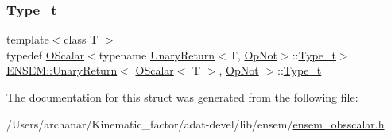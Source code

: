 \mbox{\label{structENSEM_1_1UnaryReturn_3_01OScalar_3_01T_01_4_00_01OpNot_01_4_a0a3874d32de1d033bfe55bfd921d73be}} 
\subsubsection{\texorpdfstring{Type\_t}{Type\_t}\hspace{0.1cm}{\footnotesize\ttfamily [3/3]}}
{\footnotesize\ttfamily template$<$class T $>$ \\
typedef \mbox{\hyperlink{classENSEM_1_1OScalar}{O\+Scalar}}$<$typename \mbox{\hyperlink{structENSEM_1_1UnaryReturn}{Unary\+Return}}$<$T, \mbox{\hyperlink{structENSEM_1_1OpNot}{Op\+Not}}$>$\+::\mbox{\hyperlink{structENSEM_1_1UnaryReturn_3_01OScalar_3_01T_01_4_00_01OpNot_01_4_a0a3874d32de1d033bfe55bfd921d73be}{Type\+\_\+t}}$>$ \mbox{\hyperlink{structENSEM_1_1UnaryReturn}{E\+N\+S\+E\+M\+::\+Unary\+Return}}$<$ \mbox{\hyperlink{classENSEM_1_1OScalar}{O\+Scalar}}$<$ T $>$, \mbox{\hyperlink{structENSEM_1_1OpNot}{Op\+Not}} $>$\+::\mbox{\hyperlink{structENSEM_1_1UnaryReturn_3_01OScalar_3_01T_01_4_00_01OpNot_01_4_a0a3874d32de1d033bfe55bfd921d73be}{Type\+\_\+t}}}



The documentation for this struct was generated from the following file\+:\begin{DoxyCompactItemize}
\item 
/\+Users/archanar/\+Kinematic\+\_\+factor/adat-\/devel/lib/ensem/\mbox{\hyperlink{adat-devel_2lib_2ensem_2ensem__obsscalar_8h}{ensem\+\_\+obsscalar.\+h}}\end{DoxyCompactItemize}
